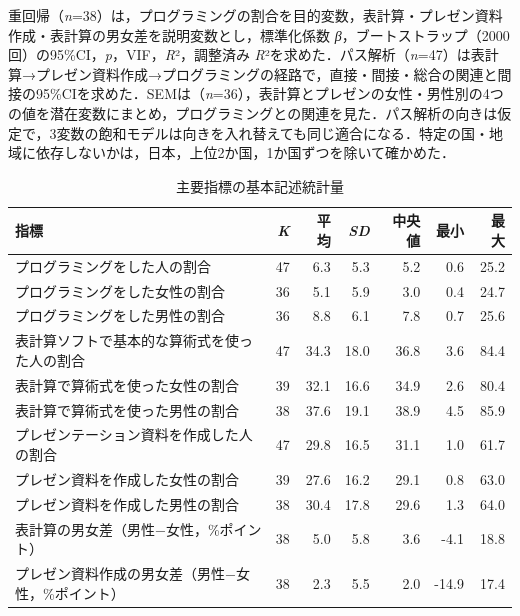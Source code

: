 \documentclass[a4paper,10pt,twocolumn]{ltjsarticle}
\begin{document}
重回帰（\textit{n}=38）は，プログラミングの割合を目的変数，表計算・プレゼン資料作成・表計算の男女差を説明変数とし，標準化係数 \textit{β}，ブートストラップ（2000回）の95\%CI，\textit{p}，VIF，\textit{R}²，調整済み \textit{R}²を求めた．パス解析（\textit{n}=47）は表計算→プレゼン資料作成→プログラミングの経路で，直接・間接・総合の関連と間接の95\%CIを求めた．SEMは（\textit{n}=36），表計算とプレゼンの女性・男性別の4つの値を潜在変数にまとめ，プログラミングとの関連を見た．パス解析の向きは仮定で，3変数の飽和モデルは向きを入れ替えても同じ適合になる．特定の国・地域に依存しないかは，日本，上位2か国，1か国ずつを除いて確かめた．
\begin{table}[!t]
\caption{主要指標の基本記述統計量}
\centering\small
\begin{tabular}{>{\raggedright\arraybackslash}p{9.2cm}rrrrrr}
\toprule
指標 & \textit{K} & 平均 & \textit{SD} & 中央値 & 最小 & 最大 \\
\midrule
プログラミングをした人の割合 & 47 & 6.3 & 5.3 & 5.2 & 0.6 & 25.2 \\
プログラミングをした女性の割合 & 36 & 5.1 & 5.9 & 3.0 & 0.4 & 24.7 \\
プログラミングをした男性の割合 & 36 & 8.8 & 6.1 & 7.8 & 0.7 & 25.6 \\
表計算ソフトで基本的な算術式を使った人の割合 & 47 & 34.3 & 18.0 & 36.8 & 3.6 & 84.4 \\
表計算で算術式を使った女性の割合 & 39 & 32.1 & 16.6 & 34.9 & 2.6 & 80.4 \\
表計算で算術式を使った男性の割合 & 38 & 37.6 & 19.1 & 38.9 & 4.5 & 85.9 \\
プレゼンテーション資料を作成した人の割合 & 47 & 29.8 & 16.5 & 31.1 & 1.0 & 61.7 \\
プレゼン資料を作成した女性の割合 & 39 & 27.6 & 16.2 & 29.1 & 0.8 & 63.0 \\
プレゼン資料を作成した男性の割合 & 38 & 30.4 & 17.8 & 29.6 & 1.3 & 64.0 \\
表計算の男女差（男性−女性，\%ポイント） & 38 & 5.0 & 5.8 & 3.6 & -4.1 & 18.8 \\
プレゼン資料作成の男女差（男性−女性，\%ポイント） & 38 & 2.3 & 5.5 & 2.0 & -14.9 & 17.4 \\
\bottomrule
\end{tabular}
\par{}
\end{table}
\end{document}
